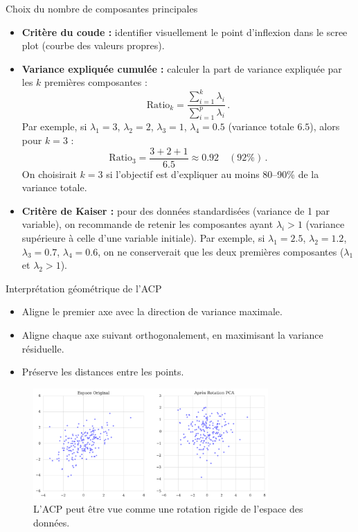 \documentclass{beamer}
\begin{document}
\begin{frame}{Choix du nombre de composantes principales}
\small
\begin{itemize}
    \item \textbf{Critère du coude :} identifier visuellement le point d'inflexion dans le scree plot (courbe des valeurs propres).
    \item \textbf{Variance expliquée cumulée :} calculer la part de variance expliquée par les $k$ premières composantes : 
    \[
        \text{Ratio}_k = \frac{\sum_{i=1}^k \lambda_i}{\sum_{i=1}^{p} \lambda_i}\,. 
    \]
    Par exemple, si $\lambda_1=3$, $\lambda_2=2$, $\lambda_3=1$, $\lambda_4=0.5$ (variance totale $6.5$), alors pour $k=3$ : 
    \[
        \text{Ratio}_3 = \frac{3+2+1}{6.5} \approx 0.92 \quad (92\%)\,.
    \] 
    On choisirait $k=3$ si l'objectif est d'expliquer au moins 80--90\% de la variance totale.
    \item \textbf{Critère de Kaiser :} pour des données standardisées (variance de 1 par variable), on recommande de retenir les composantes ayant $\lambda_i > 1$ (variance supérieure à celle d'une variable initiale). Par exemple, si $\lambda_1=2.5$, $\lambda_2=1.2$, $\lambda_3=0.7$, $\lambda_4=0.6$, on ne conserverait que les deux premières composantes ($\lambda_1$ et $\lambda_2 > 1$).
\end{itemize}
\end{frame}

\begin{frame}{Interprétation géométrique de l'ACP}
\begin{itemize}
    \item Aligne le premier axe avec la direction de variance maximale.
    \item Aligne chaque axe suivant orthogonalement, en maximisant la variance résiduelle.
    \item Préserve les distances entre les points.
\end{itemize}

\begin{figure}
\centering
\includegraphics[width=0.8\textwidth]{pca_geometric.png}
\caption{L'ACP peut être vue comme une rotation rigide de l'espace des données.}
\end{figure}
\end{frame}
\end{document}
